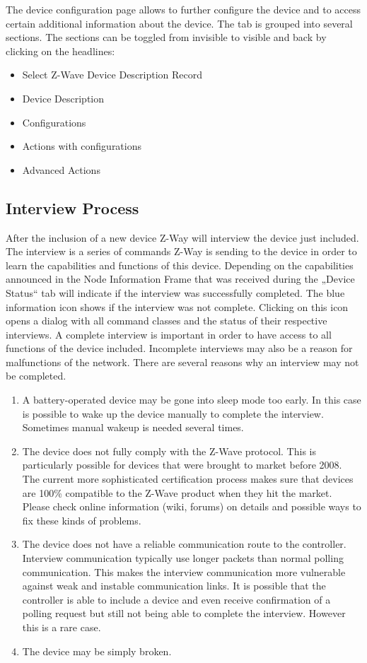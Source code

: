 The device configuration page allows to further configure the device and to access certain additional 
information about the device. The tab is grouped into several sections. The sections can be toggled 
from invisible to visible and back by clicking on the headlines:

\begin{itemize}
\item  Select Z-Wave Device Description Record
\item  Device Description
\item  Configurations
\item  Actions with configurations
\item  Advanced Actions
\end{itemize}


\subsection{Interview Process}
After the inclusion of a new device Z-Way will interview the device just included. The interview is a 
series of commands Z-Way is sending to the device in order to learn the capabilities and functions 
of this device.
Depending on the capabilities announced in the Node Information Frame that was received during 
the „Device Status“ tab will indicate if the interview was successfully completed.  The blue 
information icon shows if the interview was not complete. Clicking on this icon opens a dialog with 
all command classes and the status of their respective interviews.  
A complete interview is important in order to have access to all functions of the device included. 
Incomplete interviews may also be a reason for malfunctions of the network.
There are several reasons why an interview may not be completed.
\begin{enumerate}
\item  A battery-operated device may be gone into sleep mode too early. In this case is possible to 
wake up the device manually to complete the interview. Sometimes manual wakeup is needed several times.
\item  The device does not fully comply with the Z-Wave protocol. This is particularly possible for 
devices that were brought to market before 2008. The current more sophisticated certification 
process makes sure that devices are 100\% compatible to the Z-Wave product when they hit the market.   
Please check online information (wiki, forums) on details and possible ways to fix these kinds of problems.
\item  The device does not have a reliable communication route to the controller. Interview 
communication typically use longer packets than normal polling communication. This makes the 
interview communication more vulnerable against weak and instable communication links. It is 
possible that the controller is able to include a device and even receive confirmation of a 
polling request but still not being able to complete the interview. However this is a rare case.
\item  The device may be simply broken.
\end{enumerate}

